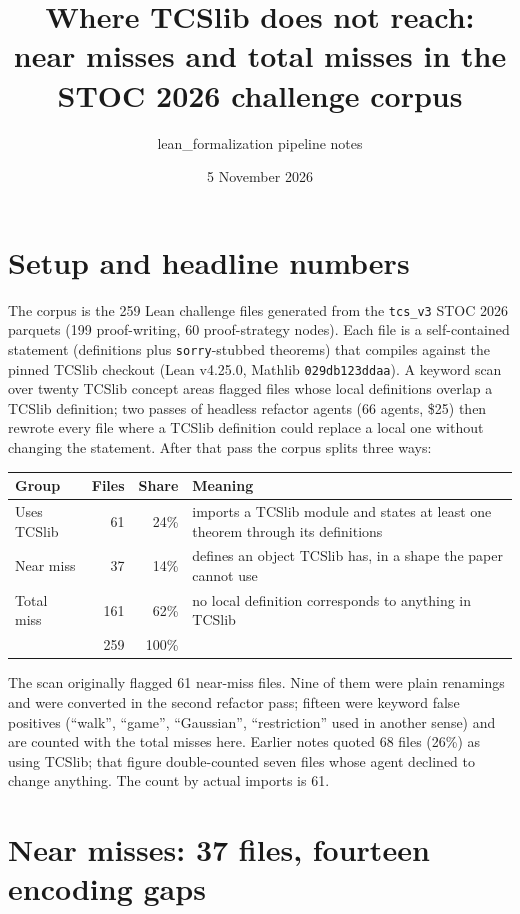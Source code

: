 \documentclass[11pt]{article}
\title{Where TCSlib does not reach:\\ near misses and total misses in the STOC 2026 challenge corpus}
\author{lean\_formalization pipeline notes}
\date{5 November 2026}
\newcommand{\code}[1]{\texttt{#1}}
\begin{document}
\maketitle

\section{Setup and headline numbers}

The corpus is the 259 Lean challenge files generated from the \code{tcs\_v3} STOC 2026 parquets
(199 proof-writing, 60 proof-strategy nodes). Each file is a self-contained statement
(definitions plus \code{sorry}-stubbed theorems) that compiles against the pinned TCSlib checkout
(Lean v4.25.0, Mathlib \code{029db123ddaa}). A keyword scan over twenty TCSlib concept areas
flagged files whose local definitions overlap a TCSlib definition; two passes of headless
refactor agents (66 agents, \$25) then rewrote every file where a TCSlib definition could replace a local one
without changing the statement. After that pass the corpus splits three ways:

\begin{center}
\begin{tabular}{lrrR{7.6cm}}
\toprule
Group & Files & Share & Meaning \\
\midrule
Uses TCSlib & 61 & 24\% & imports a TCSlib module and states at least one theorem through its definitions \\
Near miss & 37 & 14\% & defines an object TCSlib has, in a shape the paper cannot use \\
Total miss & 161 & 62\% & no local definition corresponds to anything in TCSlib \\
\midrule
 & 259 & 100\% & \\
\bottomrule
\end{tabular}
\end{center}

The scan originally flagged 61 near-miss files. Nine of them were plain renamings and were
converted in the second refactor pass; fifteen were keyword false positives (``walk'', ``game'',
``Gaussian'', ``restriction'' used in another sense) and are counted with the total misses here.
Earlier notes quoted 68 files (26\%) as using TCSlib; that figure double-counted seven files whose
agent declined to change anything. The count by actual imports is 61.

\section{Near misses: 37 files, fourteen encoding gaps}
\end{document}

